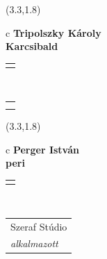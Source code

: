 \documentclass[11pt]{article}
\begin{document}
\makebox(3.3,1.8){
  \renewcommand\arraystretch{1.3}
  \begin{tabular}[c]{c}
    \hspace{8.5mm}
    \LARGE\bf{ Tripolszky Károly }\\
    \hspace{8.5mm}
    \Large{ Karcsibald }\\
    \renewcommand\arraystretch{3}
    \begin{tabular}[c]{c}
      \centering
      \fontfamily{phv}\selectfont{
        \textbf{
          \textsc{
            \scriptsize{
            \color{Dark}{ Ismerkedő }\color{Bright}{ Webmester }\color{Bright}{ Sminkmester }\color{Bright}{ Programozó }
            }
          }
        }
      }
    \end{tabular}
    \\
    \renewcommand\arraystretch{1}
    \begin{tabular}{p{3.3in}}
      \hspace{.7cm}\\
      \hspace{.7cm}\emph{  }\\
    \end{tabular}
  \end{tabular}
}

\makebox(3.3,1.8){
  \renewcommand\arraystretch{1.3}
  \begin{tabular}[c]{c}
    \hspace{8.5mm}
    \LARGE\bf{ Perger István }\\
    \hspace{8.5mm}
    \Large{ peri }\\
    \renewcommand\arraystretch{3}
    \begin{tabular}[c]{c}
      \centering
      \fontfamily{phv}\selectfont{
        \textbf{
          \textsc{
            \scriptsize{
            \color{Dark}{ Ismerkedő }\color{Bright}{ Webmester }\color{Bright}{ Sminkmester }\color{Bright}{ Programozó }
            }
          }
        }
      }
    \end{tabular}
    \\
    \renewcommand\arraystretch{1}
    \begin{tabular}{p{3.3in}}
      \hspace{.7cm}Szeraf Stúdio\\
      \hspace{.7cm}\emph{ alkalmazott }\\
    \end{tabular}
  \end{tabular}
}
\end{document}
